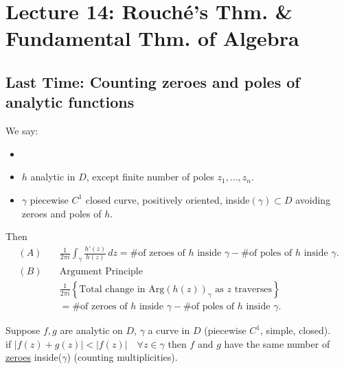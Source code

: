 \chapter{Lecture 14: Rouché's Thm. \& Fundamental Thm. of Algebra}

\section{Last Time: Counting zeroes and poles of analytic functions}

\begin{proposition}
    We say:
    \begin{itemize}
        \item[]
        \item $h$ analytic in $D$, except finite number of poles $z_1, \ldots, z_n$.
        \item $\gamma$ piecewise $C^1$ closed curve, positively oriented, inside$(\gamma) \subset D$ avoiding zeroes and poles of $h$.
    \end{itemize}
    Then
    \begin{align*}
        (A) \quad & \frac{1}{2\pi i} \int_{\gamma} \frac{h'(z)}{h(z)} \, dz = \text{\# of zeroes of $h$ inside $\gamma$} - \text{\# of poles of $h$ inside $\gamma$}. \\
        (B)\quad  & \text{Argument Principle}                                                                                                                         \\
                  & \frac{1}{2\pi i} \left\{\text{Total change in Arg}(h(z))_{\gamma} \text{ as } z \text{ traverses} \right\}                                        \\
                  & = \text{\# of zeroes of $h$ inside $\gamma$} - \text{\# of poles of $h$ inside $\gamma$}.
    \end{align*}

\end{proposition}

\begin{theorem}
    Suppose $f, g$ are analytic on $D$, $\gamma$ a curve in $D$ (piecewise $C^1$, simple, closed).\\
    if $|f(z) + g(z)| < |f(z)| \quad \forall z \in \gamma$ then $f$ and $g$ have the same number of \underline{zeroes} inside($\gamma$) (counting multiplicities).
\end{theorem}

